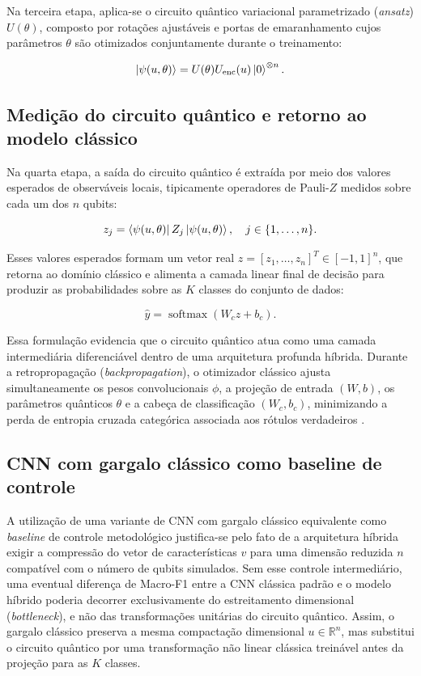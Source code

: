 \documentclass[
    12pt,
    openright,
    oneside,
    a4paper,
    english,
    brazil
]{abntex2}
\begin{document}
Na terceira etapa, aplica-se o circuito quântico variacional parametrizado (\textit{ansatz}) \(U(\theta)\), composto por rotações ajustáveis e portas de emaranhamento cujos parâmetros \(\theta\) são otimizados conjuntamente durante o treinamento:

\[
\ket{\psi(u,\theta)}
=
U(\theta)
U_{\text{enc}}(u)
\ket{0}^{\otimes n}.
\]

\subsection{Medição do circuito quântico e retorno ao modelo clássico}
\label{subsec:medicao_retorno_modelo_classico}

Na quarta etapa, a saída do circuito quântico é extraída por meio dos valores esperados de observáveis locais, tipicamente operadores de Pauli-\(Z\) medidos sobre cada um dos \(n\) qubits:

\[
z_j =
\bra{\psi(u,\theta)}
Z_j
\ket{\psi(u,\theta)},
\quad j \in \{1, \dots, n\}.
\]

Esses valores esperados formam um vetor real \(z = [z_1, \dots, z_n]^T \in [-1, 1]^n\), que retorna ao domínio clássico e alimenta a camada linear final de decisão para produzir as probabilidades sobre as \(K\) classes do conjunto de dados:

\[
\hat{y}
=
\operatorname{softmax}(W_c z + b_c).
\]

Essa formulação evidencia que o circuito quântico atua como uma camada intermediária diferenciável dentro de uma arquitetura profunda híbrida. Durante a retropropagação (\textit{backpropagation}), o otimizador clássico ajusta simultaneamente os pesos convolucionais \(\phi\), a projeção de entrada \((W, b)\), os parâmetros quânticos \(\theta\) e a cabeça de classificação \((W_c, b_c)\), minimizando a perda de entropia cruzada categórica associada aos rótulos verdadeiros \cite{schetakis2022qmlframeworks,xiang2024qccnn,long2025qcqcnn,daka2026noqcnn}.

\subsection{CNN com gargalo clássico como baseline de controle}
\label{subsec:cnn_gargalo_baseline}

A utilização de uma variante de CNN com gargalo clássico equivalente como \textit{baseline} de controle metodológico justifica-se pelo fato de a arquitetura híbrida exigir a compressão do vetor de características \(v\) para uma dimensão reduzida \(n\) compatível com o número de qubits simulados. Sem esse controle intermediário, uma eventual diferença de Macro-F1 entre a CNN clássica padrão e o modelo híbrido poderia decorrer exclusivamente do estreitamento dimensional (\textit{bottleneck}), e não das transformações unitárias do circuito quântico. Assim, o gargalo clássico preserva a mesma compactação dimensional \(u \in \mathbb{R}^{n}\), mas substitui o circuito quântico por uma transformação não linear clássica treinável antes da projeção para as \(K\) classes.
\end{document}
